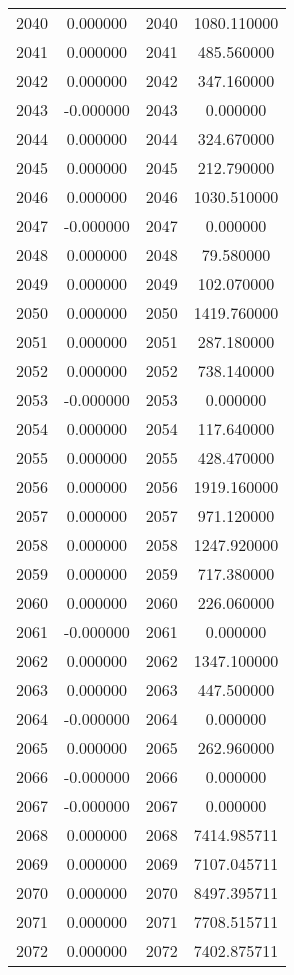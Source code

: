 \documentclass[12pt]{article}
\begin{document}
\begin{longtable}{@{}cccc@{}}
2040 & 0.000000 & 2040 & 1080.110000 \\
2041 & 0.000000 & 2041 & 485.560000 \\
2042 & 0.000000 & 2042 & 347.160000 \\
2043 & -0.000000 & 2043 & 0.000000 \\
2044 & 0.000000 & 2044 & 324.670000 \\
2045 & 0.000000 & 2045 & 212.790000 \\
2046 & 0.000000 & 2046 & 1030.510000 \\
2047 & -0.000000 & 2047 & 0.000000 \\
2048 & 0.000000 & 2048 & 79.580000 \\
2049 & 0.000000 & 2049 & 102.070000 \\
2050 & 0.000000 & 2050 & 1419.760000 \\
2051 & 0.000000 & 2051 & 287.180000 \\
2052 & 0.000000 & 2052 & 738.140000 \\
2053 & -0.000000 & 2053 & 0.000000 \\
2054 & 0.000000 & 2054 & 117.640000 \\
2055 & 0.000000 & 2055 & 428.470000 \\
2056 & 0.000000 & 2056 & 1919.160000 \\
2057 & 0.000000 & 2057 & 971.120000 \\
2058 & 0.000000 & 2058 & 1247.920000 \\
2059 & 0.000000 & 2059 & 717.380000 \\
2060 & 0.000000 & 2060 & 226.060000 \\
2061 & -0.000000 & 2061 & 0.000000 \\
2062 & 0.000000 & 2062 & 1347.100000 \\
2063 & 0.000000 & 2063 & 447.500000 \\
2064 & -0.000000 & 2064 & 0.000000 \\
2065 & 0.000000 & 2065 & 262.960000 \\
2066 & -0.000000 & 2066 & 0.000000 \\
2067 & -0.000000 & 2067 & 0.000000 \\
2068 & 0.000000 & 2068 & 7414.985711 \\
2069 & 0.000000 & 2069 & 7107.045711 \\
2070 & 0.000000 & 2070 & 8497.395711 \\
2071 & 0.000000 & 2071 & 7708.515711 \\
2072 & 0.000000 & 2072 & 7402.875711 \\

\end{longtable}
\end{document}
